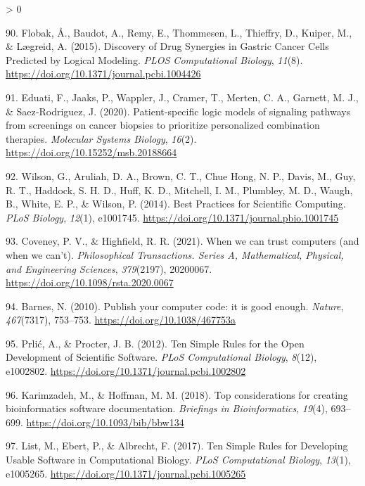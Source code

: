 \documentclass[
  12pt,
]{book}
\newlength{\cslhangindent}
\newenvironment{CSLReferences}[2] %
 {%
  \setlength{\parindent}{0pt}
  \ifodd #1 \everypar{\setlength{\hangindent}{\cslhangindent}}\ignorespaces\fi
  \ifnum #2 > 0
  \setlength{\parskip}{#2\baselineskip}
  \fi
 }%
 {}
\begin{document}
\begin{CSLReferences}{1}{0}
\leavevmode\hypertarget{ref-Flobak2015}{}%
90. Flobak, Å., Baudot, A., Remy, E., Thommesen, L., Thieffry, D., Kuiper, M., \& Lægreid, A. (2015). {Discovery of Drug Synergies in Gastric Cancer Cells Predicted by Logical Modeling}. \emph{PLOS Computational Biology}, \emph{11}(8). \url{https://doi.org/10.1371/journal.pcbi.1004426}

\leavevmode\hypertarget{ref-Eduati2020}{}%
91. Eduati, F., Jaaks, P., Wappler, J., Cramer, T., Merten, C. A., Garnett, M. J., \& Saez‐Rodriguez, J. (2020). {Patient‐specific logic models of signaling pathways from screenings on cancer biopsies to prioritize personalized combination therapies}. \emph{Molecular Systems Biology}, \emph{16}(2). \url{https://doi.org/10.15252/msb.20188664}

\leavevmode\hypertarget{ref-Wilson2014}{}%
92. Wilson, G., Aruliah, D. A., Brown, C. T., Chue Hong, N. P., Davis, M., Guy, R. T., Haddock, S. H. D., Huff, K. D., Mitchell, I. M., Plumbley, M. D., Waugh, B., White, E. P., \& Wilson, P. (2014). {Best Practices for Scientific Computing}. \emph{PLoS Biology}, \emph{12}(1), e1001745. \url{https://doi.org/10.1371/journal.pbio.1001745}

\leavevmode\hypertarget{ref-Coveney2021}{}%
93. Coveney, P. V., \& Highfield, R. R. (2021). {When we can trust computers (and when we can't)}. \emph{Philosophical Transactions. Series A, Mathematical, Physical, and Engineering Sciences}, \emph{379}(2197), 20200067. \url{https://doi.org/10.1098/rsta.2020.0067}

\leavevmode\hypertarget{ref-Barnes2010}{}%
94. Barnes, N. (2010). {Publish your computer code: it is good enough}. \emph{Nature}, \emph{467}(7317), 753--753. \url{https://doi.org/10.1038/467753a}

\leavevmode\hypertarget{ref-Prlic2012}{}%
95. Prlić, A., \& Procter, J. B. (2012). {Ten Simple Rules for the Open Development of Scientific Software}. \emph{PLoS Computational Biology}, \emph{8}(12), e1002802. \url{https://doi.org/10.1371/journal.pcbi.1002802}

\leavevmode\hypertarget{ref-Karimzadeh2018}{}%
96. Karimzadeh, M., \& Hoffman, M. M. (2018). {Top considerations for creating bioinformatics software documentation}. \emph{Briefings in Bioinformatics}, \emph{19}(4), 693--699. \url{https://doi.org/10.1093/bib/bbw134}

\leavevmode\hypertarget{ref-List2017}{}%
97. List, M., Ebert, P., \& Albrecht, F. (2017). {Ten Simple Rules for Developing Usable Software in Computational Biology}. \emph{PLoS Computational Biology}, \emph{13}(1), e1005265. \url{https://doi.org/10.1371/journal.pcbi.1005265}


\end{CSLReferences}
\end{document}
